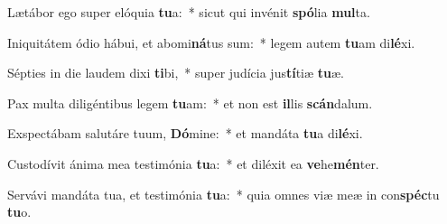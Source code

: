 \item Lætábor ego super elóquia \textbf{tu}a:~* sicut qui invénit \textbf{spó}lia \textbf{mul}ta.
\item Iniquitátem ódio hábui, et abomi\textbf{ná}tus sum:~* legem autem \textbf{tu}am di\textbf{lé}xi.
\item Sépties in die laudem dixi \textbf{ti}bi,~* super judícia jus\textbf{tí}tiæ \textbf{tu}æ.
\item Pax multa diligéntibus legem \textbf{tu}am:~* et non est \textbf{il}lis \textbf{scán}dalum.
\item Exspectábam salutáre tuum, \textbf{Dó}mine:~* et mandáta \textbf{tu}a di\textbf{lé}xi.
\item Custodívit ánima mea testimónia \textbf{tu}a:~* et diléxit ea \textbf{ve}he\textbf{mén}ter.
\item Servávi mandáta tua, et testimónia \textbf{tu}a:~* quia omnes viæ meæ in con\textbf{spéc}tu \textbf{tu}o.
